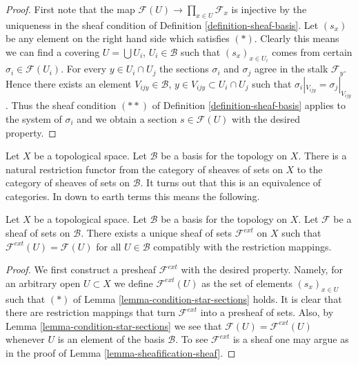 \begin{proof}
First note that the map
$\mathcal{F}(U) \to \prod\nolimits_{x \in U} \mathcal{F}_x$
is injective by the uniqueness in the sheaf condition
of Definition \ref{definition-sheaf-basis}. Let $(s_x)$ be
any element on the right hand side which satisfies $(*)$.
Clearly this means we can find a covering $U = \bigcup U_i$,
$U_i \in \mathcal{B}$ such that $(s_x)_{x \in U_i}$ comes from
certain $\sigma_i \in \mathcal{F}(U_i)$. For every $y \in U_i \cap U_j$
the sections $\sigma_i$ and $\sigma_j$ agree in the stalk
$\mathcal{F}_y$. Hence there exists an element $V_{ijy} \in \mathcal{B}$,
$y \in V_{ijy} \subset U_i \cap U_j$ such that $\sigma_i|_{V_{ijy}} = \sigma_j|_{V_{ijy}}$.
Thus the sheaf condition $(**)$ of Definition \ref{definition-sheaf-basis}
applies to the system of $\sigma_i$ and we obtain a section
$s \in \mathcal{F}(U)$ with the desired property.
\end{proof}

\noindent
Let $X$ be a topological space.
Let $\mathcal{B}$ be a basis for the topology on $X$.
There is a natural restriction functor from the category
of sheaves of sets on $X$ to the category of sheaves of
sets on $\mathcal{B}$. It turns out that this is an equivalence
of categories. In down to earth terms this means the following.

\begin{lemma}
\label{lemma-extend-off-basis}
Let $X$ be a topological space.
Let $\mathcal{B}$ be a basis for the topology on $X$.
Let $\mathcal{F}$ be a sheaf of sets on $\mathcal{B}$.
There exists a unique sheaf of sets $\mathcal{F}^{ext}$
on $X$ such that $\mathcal{F}^{ext}(U) = \mathcal{F}(U)$
for all $U \in \mathcal{B}$ compatibly with the restriction
mappings.
\end{lemma}

\begin{proof}
We first construct a presheaf $\mathcal{F}^{ext}$ with the
desired property. Namely, for an arbitrary open $U \subset X$ we
define $\mathcal{F}^{ext}(U)$ as the set of elements
$(s_x)_{x \in U}$ such that $(*)$ of
Lemma \ref{lemma-condition-star-sections} holds.
It is clear that there are restriction mappings
that turn $\mathcal{F}^{ext}$ into a presheaf of sets.
Also, by Lemma \ref{lemma-condition-star-sections} we
see that $\mathcal{F}(U) = \mathcal{F}^{ext}(U)$
whenever $U$ is an element of the basis $\mathcal{B}$.
To see $\mathcal{F}^{ext}$ is a sheaf one may
argue as in the proof of Lemma \ref{lemma-sheafification-sheaf}.
\end{proof}


